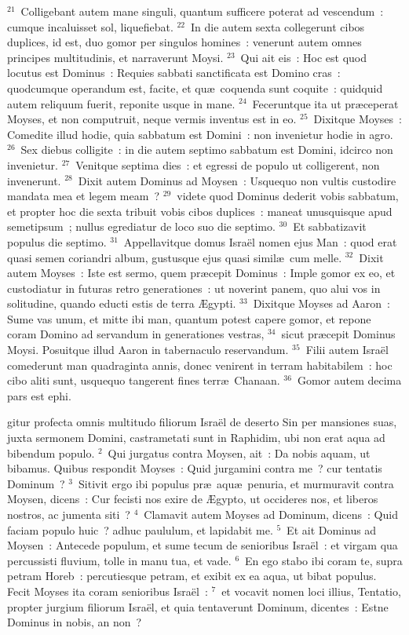 ${}^{21}$~Colligebant autem mane singuli, quantum sufficere poterat ad vescendum~: cumque incaluisset sol, liquefiebat.
${}^{22}$~In die autem sexta collegerunt cibos duplices, id est, duo gomor per singulos homines~: venerunt autem omnes principes multitudinis, et narraverunt Moysi.
${}^{23}$~Qui ait eis~: Hoc est quod locutus est Dominus~: Requies sabbati sanctificata est Domino cras~: quodcumque operandum est, facite, et qu\ae\ coquenda sunt coquite~: quidquid autem reliquum fuerit, reponite usque in mane.
${}^{24}$~Feceruntque ita ut pr\ae ceperat Moyses, et non computruit, neque vermis inventus est in eo.
${}^{25}$~Dixitque Moyses~: Comedite illud hodie, quia sabbatum est Domini~: non invenietur hodie in agro.
${}^{26}$~Sex diebus colligite~: in die autem septimo sabbatum est Domini, idcirco non invenietur.
${}^{27}$~Venitque septima dies~: et egressi de populo ut colligerent, non invenerunt.
${}^{28}$~Dixit autem Dominus ad Moysen~: Usquequo non vultis custodire mandata mea et legem meam~?
${}^{29}$~videte quod Dominus dederit vobis sabbatum, et propter hoc die sexta tribuit vobis cibos duplices~: maneat unusquisque apud semetipsum~; nullus egrediatur de loco suo die septimo.
${}^{30}$~Et sabbatizavit populus die septimo.
${}^{31}$~Appellavitque domus Isra\"el nomen ejus Man~: quod erat quasi semen coriandri album, gustusque ejus quasi simil\ae\ cum melle.
${}^{32}$~Dixit autem Moyses~: Iste est sermo, quem pr\ae cepit Dominus~: Imple gomor ex eo, et custodiatur in futuras retro generationes~: ut noverint panem, quo alui vos in solitudine, quando educti estis de terra \AE gypti.
${}^{33}$~Dixitque Moyses ad Aaron~: Sume vas unum, et mitte ibi man, quantum potest capere gomor, et repone coram Domino ad servandum in generationes vestras,
${}^{34}$~sicut pr\ae cepit Dominus Moysi. Posuitque illud Aaron in tabernaculo reservandum.
${}^{35}$~Filii autem Isra\"el comederunt man quadraginta annis, donec venirent in terram habitabilem~: hoc cibo aliti sunt, usquequo tangerent fines terr\ae\ Chanaan.
${}^{36}$~Gomor autem decima pars est ephi.

\bchapter
{}gitur profecta omnis multitudo filiorum Isra\"el de deserto Sin per mansiones suas, juxta sermonem Domini, castrametati sunt in Raphidim, ubi non erat aqua ad bibendum populo.
${}^{2}$~Qui jurgatus contra Moysen, ait~: Da nobis aquam, ut bibamus. Quibus respondit Moyses~: Quid jurgamini contra me~? cur tentatis Dominum~?
${}^{3}$~Sitivit ergo ibi populus pr\ae\ aqu\ae\ penuria, et murmuravit contra Moysen, dicens~: Cur fecisti nos exire de \AE gypto, ut occideres nos, et liberos nostros, ac jumenta siti~?
${}^{4}$~Clamavit autem Moyses ad Dominum, dicens~: Quid faciam populo huic~? adhuc paululum, et lapidabit me.
${}^{5}$~Et ait Dominus ad Moysen~: Antecede populum, et sume tecum de senioribus Isra\"el~: et virgam qua percussisti fluvium, tolle in manu tua, et vade.
${}^{6}$~En ego stabo ibi coram te, supra petram Horeb~: percutiesque petram, et exibit ex ea aqua, ut bibat populus. Fecit Moyses ita coram senioribus Isra\"el~:
${}^{7}$~et vocavit nomen loci illius, Tentatio, propter jurgium filiorum Isra\"el, et quia tentaverunt Dominum, dicentes~: Estne Dominus in nobis, an non~?


